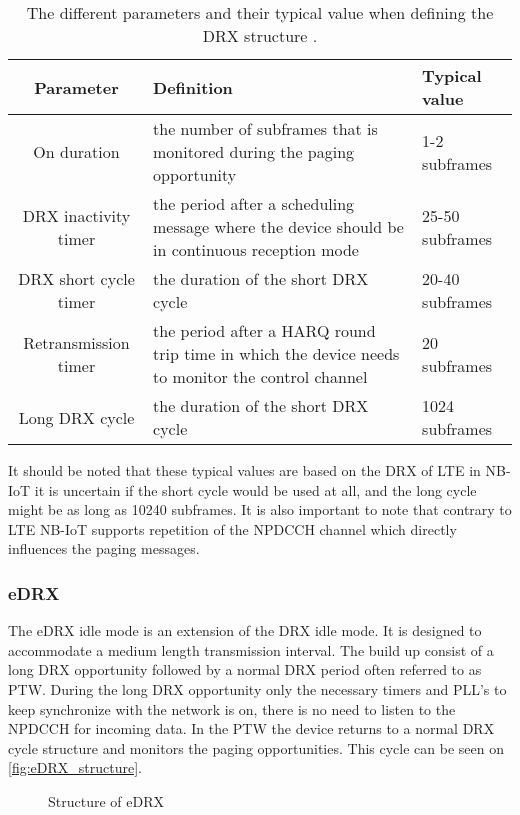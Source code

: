 \begin{table}[H]
\centering
\begin{tabular}{|c|p{6cm}|p{4cm}|} \hline
\textbf{Parameter} & \textbf{Definition} & \textbf{Typical value} \\ \hline 
On duration &  the number of subframes that is monitored during the paging opportunity & 1-2 subframes\\ \hline
DRX inactivity timer & the period after a scheduling message where the device should be in continuous reception mode & 25-50 subframes \\ \hline
DRX short cycle timer & the duration of the short DRX cycle & 20-40 subframes \\ \hline
Retransmission timer & the period after a \gls{HARQ} round trip time in which the device needs to monitor the control channel & 20  subframes \\ \hline
Long DRX cycle & the duration of the short DRX cycle & 1024 subframes \\ \hline
\end{tabular}
\caption{The different parameters and their typical value when defining the DRX structure \citep{book_LTE_for_UMTS}.}
\label{tab:DRX_parameters}
\end{table}

It should be noted that these typical values are based on the DRX of LTE in NB-IoT it is uncertain if the short cycle would be used at all, and the long cycle might be as long as 10240 subframes. It is also important to note that contrary to LTE NB-IoT supports repetition of the NPDCCH channel which directly influences the paging messages. \citep{NB-IoT_Book}


\subsubsection{eDRX}
The eDRX idle mode is an extension of the DRX idle mode. It is designed to accommodate a medium length transmission interval. The build up consist of a long DRX opportunity followed by a normal DRX period often referred to as \gls{PTW}. During the long DRX opportunity only the necessary timers and PLL's to keep synchronize with the network is on, there is no need to listen to the NPDCCH for incoming data. In the \gls{PTW} the device returns to a normal DRX cycle structure and monitors the paging opportunities. This cycle can be seen on \autoref{fig:eDRX_structure}.

\begin{figure}[H]
\centering
%
\caption{Structure of \gls{eDRX}}
\label{fig:eDRX_structure}
\end{figure}


